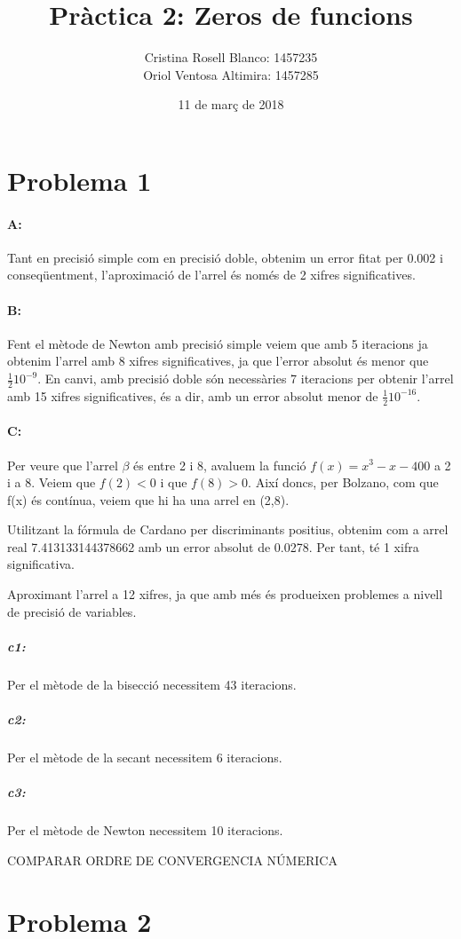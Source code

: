 \documentclass{article}
\title{Pràctica 2: Zeros de funcions}
\author{Cristina Rosell Blanco: 1457235  \\ Oriol Ventosa Altimira: 1457285}
\date{11 de març de 2018}
\begin{document}
	\maketitle
	
	\newpage

	\section{Problema 1}
	\paragraph{A:} Tant en precisió simple com en precisió doble, obtenim un error fitat per 0.002 i conseqüentment, l'aproximació de l'arrel és només de 2 xifres significatives.
	
	\paragraph{B:} Fent el mètode de Newton amb precisió simple veiem que amb 5 iteracions ja obtenim l'arrel amb 8 xifres significatives, ja que l'error absolut és menor que $\frac{1}{2}10^{-9}$. En canvi, amb precisió doble són necessàries 7 iteracions per obtenir l'arrel amb 15 xifres significatives, és a dir, amb un error absolut menor de $\frac{1}{2}10^{-16}$.
	
	\paragraph{C:} Per veure que l'arrel $\beta$ és entre 2 i 8, avaluem la funció $f(x)=x^3-x-400$ a 2 i a 8. Veiem que $f(2)<0$ i que $f(8)>0$. Així doncs, per Bolzano, com que f(x) és contínua, veiem que hi ha una arrel en (2,8). 
	
	Utilitzant la fórmula de Cardano per discriminants positius, obtenim com a arrel real 7.413133144378662 amb un error absolut de 0.0278. Per tant, té 1 xifra significativa.
	
	Aproximant l'arrel a 12 xifres, ja que amb més és produeixen problemes a nivell de precisió de variables.
	
	\subparagraph{c1:} Per el mètode de la bisecció necessitem 43 iteracions.
	\subparagraph{c2:} Per el mètode de la secant necessitem 6 iteracions.
	\subparagraph{c3:} Per el mètode de Newton necessitem 10 iteracions.
	
	COMPARAR ORDRE DE CONVERGENCIA NÚMERICA
	
	\newpage
	
	\section{Problema 2}
\end{document}
